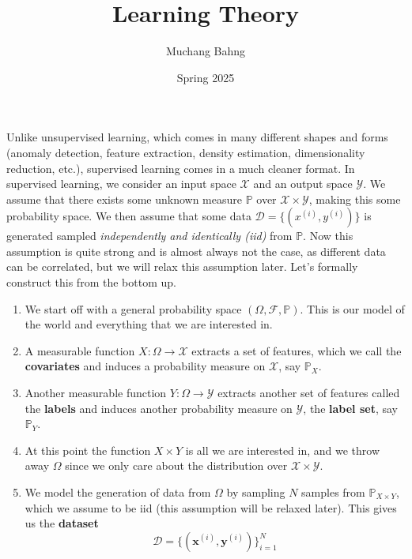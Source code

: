 \documentclass{article}
\begin{document}
\title{Learning Theory}
\author{Muchang Bahng}
\date{Spring 2025}

\maketitle
\tableofcontents
\pagebreak

  Unlike unsupervised learning, which comes in many different shapes and forms (anomaly detection, feature extraction, density estimation, dimensionality reduction, etc.), supervised learning comes in a much cleaner format. In supervised learning, we consider an input space $\mathcal{X}$ and an output space $\mathcal{Y}$. We assume that there exists some unknown measure $\mathbb{P}$ over $\mathcal{X} \times \mathcal{Y}$, making this some probability space. We then assume that some data $\mathcal{D} = \{(x^{(i)}, y^{(i)})\}$ is generated sampled \textit{independently and identically (iid)} from $\mathbb{P}$. Now this assumption is quite strong and is almost always not the case, as different data can be correlated, but we will relax this assumption later. Let's formally construct this from the bottom up. 

  \begin{enumerate}
    \item We start off with a general probability space $(\Omega, \mathcal{F}, \mathbb{P})$. This is our model of the world and everything that we are interested in. 

    \item A measurable function $X: \Omega \rightarrow \mathcal{X}$ extracts a set of features, which we call the \textbf{covariates} and induces a probability measure on $\mathcal{X}$, say $\mathbb{P}_X$. 

    \item Another measurable function $Y: \Omega \rightarrow \mathcal{Y}$ extracts another set of features called the \textbf{labels} and induces another probability measure on $\mathcal{Y}$, the \textbf{label set}, say $\mathbb{P}_Y$. 

    \item At this point the function $X \times Y$ is all we are interested in, and we throw away $\Omega$ since we only care about the distribution over $\mathcal{X} \times \mathcal{Y}$. 

    \item We model the generation of data from $\Omega$ by sampling $N$ samples from $\mathbb{P}_{X \times Y}$, which we assume to be iid (this assumption will be relaxed later). This gives us the \textbf{dataset} 
      \[\mathcal{D} = \{(\mathbf{x}^{(i)}, \mathbf{y}^{(i)}) \}_{i=1}^N\]
  \end{enumerate}
\end{document}

